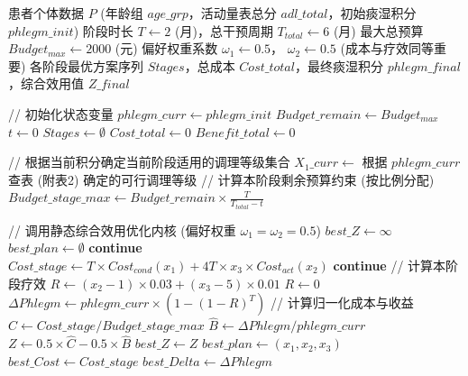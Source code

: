 \documentclass[12pt,a4paper]{article}
\begin{document}
\begin{algorithm}[H]
\caption{完备形态模型：融合动态调整与综合效用的干预方案优化}
\label{alg:integrated_model}
\begin{algorithmic}[1]
\REQUIRE 患者个体数据 $P$ (年龄组 $age\_grp$，活动量表总分 $adl\_total$，初始痰湿积分 $phlegm\_init$)
\REQUIRE 阶段时长 $T \gets 2$ (月)，总干预周期 $T_{total} \gets 6$ (月)
\REQUIRE 最大总预算 $Budget_{max} \gets 2000$ (元)
\REQUIRE 偏好权重系数 $\omega_1 \gets 0.5$， $\omega_2 \gets 0.5$ (成本与疗效同等重要)
\ENSURE 各阶段最优方案序列 $Stages$，总成本 $Cost\_total$，最终痰湿积分 $phlegm\_final$，综合效用值 $Z\_final$

\STATE // 初始化状态变量
\STATE $phlegm\_curr \gets phlegm\_init$
\STATE $Budget\_remain \gets Budget_{max}$
\STATE $t \gets 0$
\STATE $Stages \gets \emptyset$
\STATE $Cost\_total \gets 0$
\STATE $Benefit\_total \gets 0$

    \STATE // 根据当前积分确定当前阶段适用的调理等级集合
    \STATE $X_1\_curr \gets$ 根据 $phlegm\_curr$ 查表 (附表2) 确定的可行调理等级
    \STATE // 计算本阶段剩余预算约束 (按比例分配)
    \STATE $Budget\_stage\_max \gets Budget\_remain \times \frac{T}{T_{total} - t}$
    
    \STATE // 调用静态综合效用优化内核 (偏好权重 $\omega_1=\omega_2=0.5$)
    \STATE $best\_Z \gets \infty$
    \STATE $best\_plan \gets \emptyset$
                    \STATE \textbf{continue}
                \ENDIF
                \STATE $Cost\_stage \gets T \times Cost_{cond}(x_1) + 4T \times x_3 \times Cost_{act}(x_2)$
                    \STATE \textbf{continue}
                \ENDIF
                \STATE // 计算本阶段疗效
                    \STATE $R \gets (x_2 - 1) \times 0.03 + (x_3 - 5) \times 0.01$
                \ELSE
                    \STATE $R \gets 0$
                \ENDIF
                \STATE $\Delta Phlegm \gets phlegm\_curr \times (1 - (1 - R)^T)$
                \STATE // 计算归一化成本与收益
                \STATE $\hat{C} \gets Cost\_stage / Budget\_stage\_max$
                \STATE $\hat{B} \gets \Delta Phlegm / phlegm\_curr$
                \STATE $Z \gets 0.5 \times \hat{C} - 0.5 \times \hat{B}$  
                    \STATE $best\_Z \gets Z$
                    \STATE $best\_plan \gets (x_1, x_2, x_3)$
                    \STATE $best\_Cost \gets Cost\_stage$
                    \STATE $best\_Delta \gets \Delta Phlegm$
                \ENDIF
            \ENDFOR
        \ENDFOR
    \ENDFOR
    

\end{algorithmic}
\end{algorithm}
\end{document}
